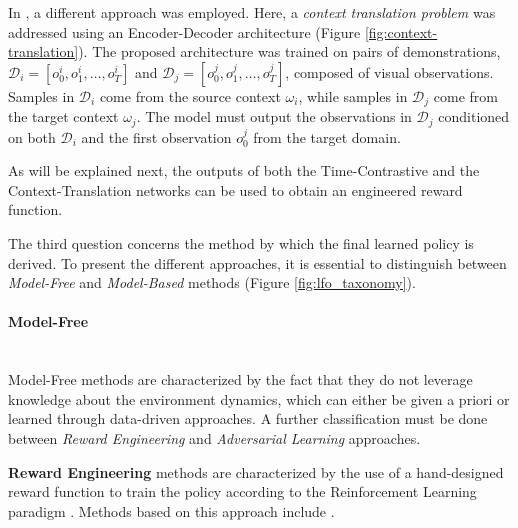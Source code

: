 In \cite{liu2018imitation_from_observation}, a different approach was employed. Here, a \textit{context translation problem} was addressed using an Encoder-Decoder architecture (Figure \ref{fig:context-translation}). The proposed architecture was trained on pairs of demonstrations, $\mathcal{D}_{i}=[o^{i}_{0},o^{i}_{1},\dots,o^{i}_{T}]$ and $\mathcal{D}_{j}=[o^{j}_{0},o^{j}_{1},\dots,o^{j}_{T}]$, composed of visual observations. Samples in $\mathcal{D}_{i}$ come from the source context $\omega_{i}$, while samples in $\mathcal{D}_{j}$ come from the target context $\omega_{j}$. The model must output the observations in $\mathcal{D}_{j}$ conditioned on both $\mathcal{D}_{i}$ and the first observation $o^{j}_{0}$ from the target domain.

As will be explained next, the outputs of both the Time-Contrastive and the Context-Translation networks can be used to obtain an engineered reward function.



The third question concerns the method by which the final learned policy is derived. To present the different approaches, it is essential to distinguish between \textit{Model-Free} and \textit{Model-Based} methods (Figure \ref{fig:lfo_taxonomy}).



\paragraph*{Model-Free}\mbox{}\\
Model-Free methods are characterized by the fact that they do not leverage knowledge about the environment dynamics, which can either be given a priori or learned through data-driven approaches. A further classification must be done between \textit{Reward Engineering} and \textit{Adversarial Learning} approaches.

\textbf{Reward Engineering} methods are characterized by the use of a hand-designed reward function to train the policy according to the Reinforcement Learning paradigm \cite{sutton2018reinforcement}. Methods based on this approach include \cite{liu2018imitation_from_observation,sermanet2018time_contrastive,xiong2021learning_by_watching,zakka2022xirl}.

